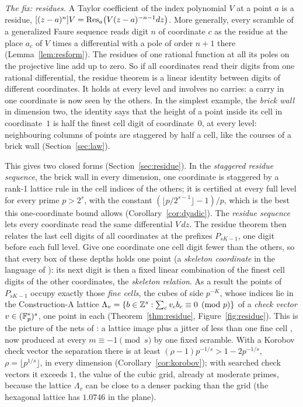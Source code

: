 \emph{The fix: residues.} A Taylor coefficient of the index polynomial $V$ at a point $a$ is a residue, $[(z-a)^n]V=\operatorname{Res}_a\bigl(V(z-a)^{-n-1}dz\bigr)$. More generally, every scramble of a generalized Faure sequence reads digit $n$ of coordinate $c$ as the residue at the place $a_c$ of $V$ times a differential with a pole of order $n+1$ there (Lemma~\ref{lem:resform}). The residues of one rational function at all its poles on the projective line add up to zero. So if all coordinates read their digits from one rational differential, the residue theorem is a linear identity between digits of different coordinates. It holds at every level and involves no carries: a carry in one coordinate is now seen by the others. In the simplest example, the \emph{brick wall} in dimension two, the identity says that the height of a point inside its cell in coordinate~$1$ is half the finest cell digit of coordinate~$0$, at every level: neighbouring columns of points are staggered by half a cell, like the courses of a brick wall (Section~\ref{sec:law}).

This gives two closed forms (Section~\ref{sec:residue}). In the \emph{staggered residue sequence}, the brick wall in every dimension, one coordinate is staggered by a rank-1 lattice rule in the cell indices of the others; it is certified at every full level for every prime $p>2^s$, with the constant $(\lfloor p/2^{s-1}\rfloor-1)/p$, which is the best this one-coordinate bound allows (Corollary~\ref{cor:dyadic}). The \emph{residue sequence} lets every coordinate read the same differential $V\,dz$. The residue theorem then relates the last cell digits of all coordinates at the prefixes $P_{sK-1}$, one digit before each full level. Give one coordinate one cell digit fewer than the others, so that every box of these depths holds one point (a \emph{skeleton coordinate} in the language of \cite{Gru26geo}): its next digit is then a fixed linear combination of the finest cell digits of the other coordinates, the \emph{skeleton relation}. As a result the points of $P_{sK-1}$ occupy exactly those \emph{fine cells}, the cubes of side $p^{-K}$, whose indices lie in the Construction-A lattice $\Lambda_v=\{b\in\mathbb{Z}^s:\sum_cv_cb_c\equiv0\pmod p\}$ of a \emph{check vector} $v\in(\mathbb{F}_p^*)^s$, one point in each (Theorem~\ref{thm:residue}, Figure~\ref{fig:residue}). This is the picture of the nets of \cite{Gru26geo}: a lattice image plus a jitter of less than one fine cell%
, now produced at every $m\equiv-1\pmod s$ by one fixed scramble. With a Korobov check vector the separation there is at least $(\rho-1)p^{-1/s}>1-2p^{-1/s}$, $\rho=\lfloor p^{1/s}\rfloor$, in every dimension (Corollary~\ref{cor:korobov}); with searched check vectors it exceeds $1$, the value of the cubic grid, already at moderate primes, because the lattice $\Lambda_v$ can be close to a denser packing than the grid (the hexagonal lattice has $1.0746$ in the plane).

